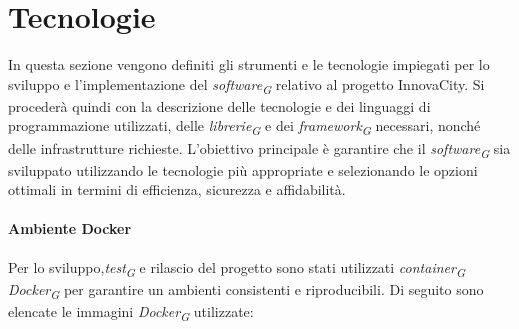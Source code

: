 \section{Tecnologie}
In questa sezione vengono definiti gli strumenti e le tecnologie impiegati per lo sviluppo e l'implementazione del \textit{software}\textsubscript{\textit{G}} relativo al progetto InnovaCity. Si procederà quindi con la descrizione delle tecnologie e dei linguaggi di programmazione utilizzati, delle \textit{librerie}\textsubscript{\textit{G}} e dei \textit{framework}\textsubscript{\textit{G}} necessari, nonché delle infrastrutture richieste. L'obiettivo principale è garantire che il \textit{software}\textsubscript{\textit{G}} sia sviluppato utilizzando le tecnologie più appropriate e selezionando le opzioni ottimali in termini di efficienza, sicurezza e affidabilità.

\paragraph*{Ambiente Docker}
Per lo sviluppo,\textit{test}\textsubscript{\textit{G}} e rilascio del progetto sono stati utilizzati \textit{container}\textsubscript{\textit{G}} \textit{Docker}\textsubscript{\textit{G}} per garantire un ambienti consistenti e riproducibili. Di seguito sono elencate le immagini \textit{Docker}\textsubscript{\textit{G}} utilizzate:

